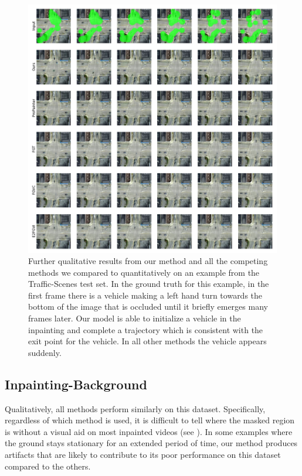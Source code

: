 \begin{figure}
\begin{center}
    \centering
    \captionsetup{type=figure}
    \includegraphics[width=\linewidth]{figures/additional-samples/ts2.pdf}
    \caption[Further qualitative results from our method and all competing methods on another example from the Traffic-Scenes test set.]{Further qualitative results from our method and all the competing methods we compared to quantitatively on an example from the Traffic-Scenes test set. In the ground truth for this example, in the first frame there is a vehicle making a left hand turn towards the bottom of the image that is occluded until it briefly emerges many frames later. Our model is able to initialize a vehicle in the inpainting and complete a trajectory which is consistent with the exit point for the vehicle. In all other methods the vehicle appears suddenly. } 
    \label{fig:ts2}
\end{center}
\end{figure}
\subsection{Inpainting-Background}
Qualitatively, all methods perform similarly on this dataset. Specifically, regardless of which method is used, it is difficult to tell where the masked region is without a visual aid on most inpainted videos (see ). In some examples where the ground stays stationary for an extended period of time, our method produces artifacts that are likely to contribute to its poor performance on this dataset
compared to the others. 

